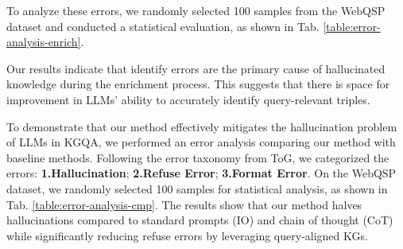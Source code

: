 \documentclass[11pt]{article}
\begin{document}
To analyze these errors, we randomly selected 100 samples from the WebQSP dataset and conducted a statistical evaluation, as shown in Tab. \ref{table:error-analysis-enrich}.

\begin{table}[]
\centering
{}
\caption{Error analysis during enrichment process.}
\label{table:error-analysis-enrich}
\end{table}

Our results indicate that identify errors are the primary cause of hallucinated knowledge during the enrichment process. This suggests that there is space for improvement in LLMs' ability to accurately identify query-relevant triples.

To demonstrate that our method effectively mitigates the hallucination problem of LLMs in KGQA, we performed an error analysis comparing our method with baseline methods. Following the error taxonomy from ToG, we categorized the errors: \textbf{1.Hallucination}; \textbf{2.Refuse Error}; \textbf{3.Format Error}. On the WebQSP dataset, we randomly selected 100 samples for statistical analysis, as shown in Tab. \ref{table:error-analysis-cmp}. The results show that our method halves hallucinations compared to standard prompts (IO) and chain of thought (CoT) while significantly reducing refuse errors by leveraging query-aligned KGs.

\begin{table}[]
\centering
{}
\caption{Error analysis comparison with baseline methods.}
\label{table:error-analysis-cmp}
\end{table}
\end{document}

